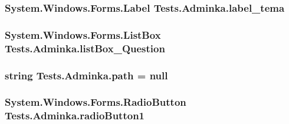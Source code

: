 \subsubsection[{\texorpdfstring{label\+\_\+tema}{label_tema}}]{\setlength{\rightskip}{0pt plus 5cm}System.\+Windows.\+Forms.\+Label Tests.\+Adminka.\+label\+\_\+tema\hspace{0.3cm}{\ttfamily [private]}}\hypertarget{class_tests_1_1_adminka_ad8ff4a93c8081fe3b0bf11d4dc72e07f}{}\label{class_tests_1_1_adminka_ad8ff4a93c8081fe3b0bf11d4dc72e07f}
\subsubsection[{\texorpdfstring{list\+Box\+\_\+\+Question}{listBox_Question}}]{\setlength{\rightskip}{0pt plus 5cm}System.\+Windows.\+Forms.\+List\+Box Tests.\+Adminka.\+list\+Box\+\_\+\+Question\hspace{0.3cm}{\ttfamily [private]}}\hypertarget{class_tests_1_1_adminka_a2fdae13c03c82b36031341dd4990803f}{}\label{class_tests_1_1_adminka_a2fdae13c03c82b36031341dd4990803f}
\subsubsection[{\texorpdfstring{path}{path}}]{\setlength{\rightskip}{0pt plus 5cm}string Tests.\+Adminka.\+path = null\hspace{0.3cm}{\ttfamily [private]}}\hypertarget{class_tests_1_1_adminka_aee4c653fce4f868e0443f71f103073f5}{}\label{class_tests_1_1_adminka_aee4c653fce4f868e0443f71f103073f5}
\subsubsection[{\texorpdfstring{radio\+Button1}{radioButton1}}]{\setlength{\rightskip}{0pt plus 5cm}System.\+Windows.\+Forms.\+Radio\+Button Tests.\+Adminka.\+radio\+Button1\hspace{0.3cm}{\ttfamily [private]}}\hypertarget{class_tests_1_1_adminka_abc6ff687eb6405c378c69eb77c0a531c}{}\label{class_tests_1_1_adminka_abc6ff687eb6405c378c69eb77c0a531c}
